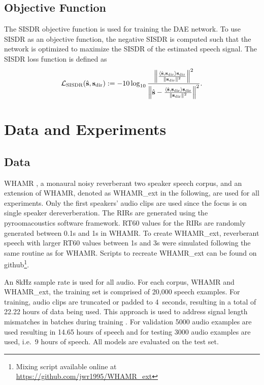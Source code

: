 \documentclass[conference,a4paper]{IEEEtran}
\begin{document}
\subsection{Objective Function}
The \ac{SISDR} objective function
\cite{LeRoux} is used for training the \ac{DAE} network. To use \ac{SISDR} as an objective function, the negative \ac{SISDR} is computed such that the network is optimized to maximize the \ac{SISDR} of the estimated speech signal. The \ac{SISDR} loss function is defined as
\begin{equation} 
\label{eq:DefSISDR}
\mathcal{L}_\text{SISDR}(\hat{\boldsymbol{\mathrm{s}}},\boldsymbol{\mathrm{s}}_\mathrm{dir}): 
= - 10\log_{10} \frac{\left\Vert 
\frac{\langle \hat{\boldsymbol{\mathrm{s}}},\boldsymbol{\mathrm{s}}_\mathrm{dir}\rangle 
\boldsymbol{\mathrm{s}}_\mathrm{dir}}{\Vert \boldsymbol{\mathrm{s}}_\mathrm{dir}\Vert^{2}}\right\Vert^{2}}{\left\Vert\hat{\boldsymbol{\mathrm{s}}}-\frac{\langle \hat{\boldsymbol{\mathrm{s}}},\boldsymbol{\mathrm{s}}_\mathrm{dir}\rangle 
\boldsymbol{\mathrm{s}}_\mathrm{dir}}{\Vert \boldsymbol{\mathrm{s}}_\mathrm{dir}\Vert^{2}}\right\Vert^{2}}.
\end{equation}
\section{Data and Experiments}\label{sec:4}
\subsection{Data}
WHAMR \cite{WHAMR}, a monaural noisy reverberant two speaker speech corpus, and an extension of WHAMR, 
{denoted as WHAMR\_ext in the following},
are used for all experiments. Only the first speaker{s'} audio clips are used since the focus is on single speaker dereverberation. The \acp{RIR} are generated using the pyroomacoustics \cite{pyroomacoustics} software framework. RT60 values for the \acp{RIR} are randomly generated between 0.1s and 1s {in WHAMR}. To create WHAMR\_ext, reverberant speech with larger RT60 values between 1s and 3s were simulated following the same routine as {for} WHAMR. 
{Scripts} to recreate WHAMR\_ext {can} be found on github\footnote{{Mixing script available online at} \url{https://github.com/jwr1995/WHAMR\_ext}}.

An 8kHz sample rate is used for all audio. For each corpus, WHAMR and WHAMR\_ext, the training set is comprised of 20,000 speech examples. For training, audio clips are truncated
or padded to 4~seconds, resulting in a total of 22.22 hours of data being used. This approach is used to address signal length mismatches in batches during training \cite{WHAMR}. For validation 5000 audio examples are used {resulting in} 14.65 hours of speech and for testing 3000 audio examples are used{, i.e.~}9 hours of speech. All models are evaluated on the test set.
\end{document}
